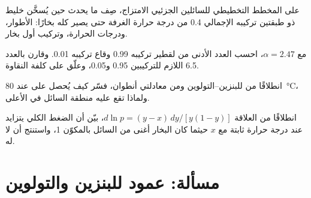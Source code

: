 \begin{exercise}[$\star\star$]\label{exo:b2:liquid-vapour-diagrams:9}
على المخطط التخطيطي للسائلين الجزئيي الامتزاج، صِف ما يحدث
حين يُسخَّن خليط ذو طبقتين تركيبه الإجمالي 0.4 من درجة حرارة الغرفة
حتى يصير كله بخارًا: الأطوار، ودرجات الحرارة، وتركيب
أول بخار.
\end{exercise}

\begin{exercise}[$\star\star\star$]\label{exo:b2:liquid-vapour-diagrams:10}
مع $\alpha = 2.47$، احسب العدد الأدنى من  لقطير
تركيبه 0.99 وقاع تركيبه 0.01. وقارن بالعدد 6.5 اللازم للتركيبين 0.95
و0.05، وعلّق على كلفة النقاوة.
\end{exercise}

\begin{exercise}[$\star\star\star$]\label{exo:b2:liquid-vapour-diagrams:11}
انطلاقًا من  للبنزين--التولوين ومن معادلتي أنطوان،
فسّر كيف يُحصل على  عند \qty{80}{\degreeCelsius}،
ولماذا تقع عليه منطقة السائل في الأعلى.
\end{exercise}

\begin{exercise}[$\star\star\star$]\label{exo:b2:liquid-vapour-diagrams:12}
انطلاقًا من العلاقة $d\ln p = (y - x)\,dy/[y(1 - y)]$، بيّن أن الضغط الكلي يتزايد
عند درجة حرارة ثابتة مع $x$ حيثما كان البخار أغنى من السائل بالمكوّن 1،
واستنتج أن  لا  له.
\end{exercise}

\section{مسألة: عمود للبنزين والتولوين}

